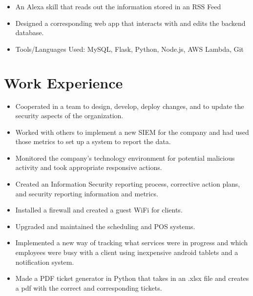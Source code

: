 \documentclass[11.99pt,letterpaper,sans]{moderncv}        %
\begin{document}
{\begin{itemize}%
	\item An Alexa skill that reads out the information stored in an RSS Feed 
	\item Designed a corresponding web app that interacts with and edits the backend database.
	\item Tools/Languages Used: MySQL, Flask, Python, Node.js, AWS Lambda, Git
	\end{itemize}}

\section{Work Experience}
{\begin{itemize}%
	\item Cooperated in a team to design, develop, deploy changes, and to update the security aspects of the organization.
	\item Worked with others to implement a new SIEM for the company and had used those metrics to set up a system to report the data.
	\item Monitored the company's technology environment for potential malicious activity and took appropriate responsive actions.
	\item Created an Information Security reporting process, corrective action plans, and security reporting information and metrics.\\
	\end{itemize}} 
{\begin{itemize}%
	\item Installed a firewall and created a guest WiFi for clients.
	\item Upgraded and maintained the scheduling and POS systems.
	\item Implemented a new way of tracking what services were in progress and which employees were busy with a client using inexpensive \newline \hspace*{.3cm} android tablets and a notification system. 
	\item Made a PDF ticket generator in Python that takes in an .xlsx file and creates a pdf with the correct and corresponding tickets.\\
	\end{itemize}}
\end{document}
